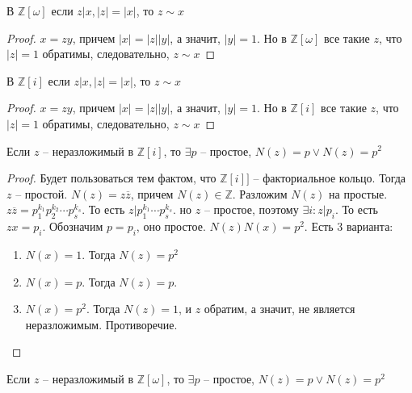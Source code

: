 \documentclass{article}
\begin{document}
\begin{statement}
    В $\mathbb{Z}[\omega]$ если $z | x, |z| = |x|$, то $z \sim x$
\end{statement}

\begin{proof}
    $x = zy$, причем $|x| = |z| |y|$, а значит, $|y| = 1$. Но в $\mathbb{Z}[\omega]$ все такие $z$, что $|z| = 1$
    обратимы, следовательно, $z \sim x$
\end{proof}

\begin{statement}
    В $\mathbb{Z}[i]$ если $z | x, |z| = |x|$, то $z \sim x$
\end{statement}

\begin{proof} 
    $x = zy$, причем $|x| = |z| |y|$, а значит, $|y| = 1$. Но в $\mathbb{Z}[i]$ все такие $z$, что $|z| = 1$
    обратимы, следовательно, $z \sim x$
\end{proof}

\begin{statement}
    Если $z$ -- неразложимый в $\mathbb{Z}[i]$, то $\exists p$ -- простое, $N(z) = p \vee N(z) = p^2$
\end{statement}

\begin{proof}
    Будет пользоваться тем фактом, что $\mathbb{Z}[i]]$ -- факториальное кольцо. Тогда $z$ -- простой. $N(z) = z
    \overline z$, причем $N(z) \in \mathbb{Z}$. Разложим $N(z)$ на простые. $z \overline z = p_1^{k_1} p_2^{k_2} \cdots
    p_s^{k_s}$. То есть $z | p_1^{k_1} \cdots p_s^{k_s}$. но $z$ -- простое, поэтому $\exists i: z | p_i$. То есть $z x
    = p_i$. Обозначим $p = p_i$, оно простое. $N(z) N(x) = p^2$. Есть 3 варианта:
    \begin{enumerate}
        \item $N(x) = 1$. Тогда $N(z) = p^2$
        \item $N(x) = p$. Тогда $N(z) = p$.
        \item $N(x) = p^2$. Тогда $N(z) = 1$, и $z$ обратим, а значит, не является неразложимым. Противоречие.
    \end{enumerate}
\end{proof}

\begin{statement}
    Если $z$ -- неразложимый в $\mathbb{Z}[\omega]$, то $\exists p$ -- простое, $N(z) = p \vee N(z) = p^2$ 
\end{statement}
\end{document}
